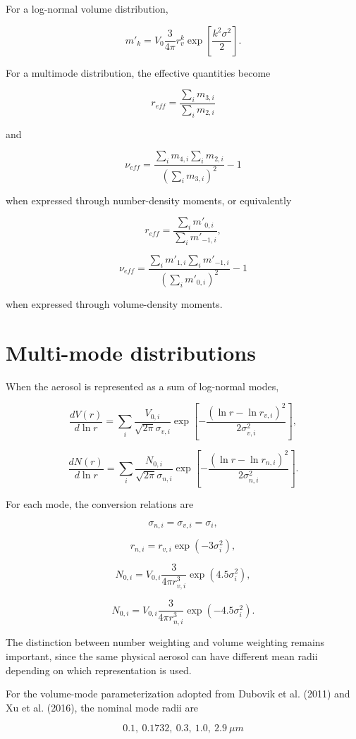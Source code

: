 \documentclass[
  letterpaper,
]{scrbook}
\begin{document}
For a log-normal volume distribution,

\[
m'_k =V_{0} \frac{3}{4 \pi} r^{k}_v\exp\left[\frac{k^2\sigma^2}{2} \right].
\]

For a multimode distribution, the effective quantities become

\[
r_{eff}=\frac{\sum_i m_{3,i}}{\sum_i m_{2,i}}
\]

and

\[
\nu_{eff}=\frac{\sum_i m_{4,i} \sum_i m_{2,i}}{(\sum_i m_{3,i})^2}-1
\]

when expressed through number-density moments, or equivalently

\[
r_{eff}=\frac{\sum_i m'_{0,i}}{\sum_i m'_{-1,i}},
\]

\[
\nu_{eff}=\frac{\sum_i m'_{1,i} \sum_i m'_{-1,i}}{(\sum_i m'_{0,i})^2}-1
\]

when expressed through volume-density moments.

\section{Multi-mode distributions}\label{multi-mode-distributions}

When the aerosol is represented as a sum of log-normal modes,

\[
\frac{d V(r)}{d \ln r}= \sum_i \frac{V_{0,i}}{\sqrt{2 \pi} \sigma_{v,i}} \exp\left[-\frac{(\ln r-\ln r_{v,i})^2}{2 \sigma_{v,i}^2}\right],
\]

\[
\frac{d N(r)}{d \ln r}= \sum_i \frac{N_{0,i}}{\sqrt{2 \pi} \sigma_{n,i}} \exp\left[-\frac{(\ln r-\ln r_{n,i})^2}{2 \sigma_{n,i}^2}\right].
\]

For each mode, the conversion relations are

\[
\sigma_{n,i}=\sigma_{v,i}=\sigma_i,
\]

\[
r_{n,i}=r_{v,i} \exp(-3 \sigma_{i}^2),
\]

\[
N_{0,i}=V_{0,i} \frac{3}{4 \pi r_{v,i}^3}\exp(4.5 \sigma_{i}^2),
\]

\[
N_{0,i}=V_{0,i} \frac{3}{4 \pi r_{n,i}^3}\exp(-4.5 \sigma_{i}^2).
\]

The distinction between number weighting and volume weighting remains
important, since the same physical aerosol can have different mean radii
depending on which representation is used.

For the volume-mode parameterization adopted from Dubovik et al. (2011)
and Xu et al. (2016), the nominal mode radii are

\[
0.1,\ 0.1732,\ 0.3,\ 1.0,\ 2.9 \ \mu m
\]
\end{document}
